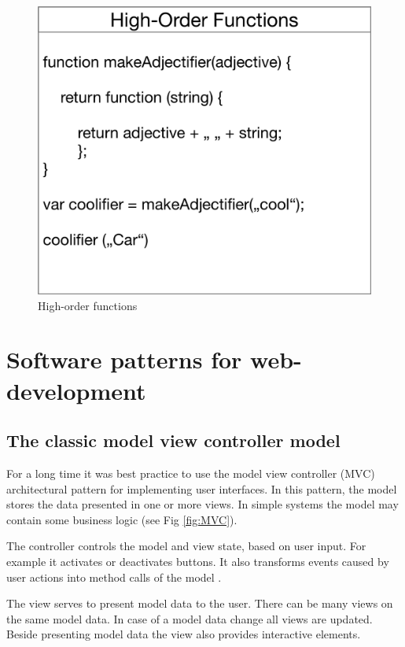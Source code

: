 \begin{figure}[H]
	\centering
	\includegraphics[scale=0.6]{bilder/grundlagen/fp1.png}
	\caption{High-order functions}
	\label{fig:HF}
\end{figure}

\section{Software patterns for web-development}

\subsection{The classic model view controller model}

For a long time it was best practice to use the model view controller (MVC) architectural 
pattern for implementing user interfaces. In this pattern, the model stores the data 
presented in one or more views. In simple systems the model may contain some
 business logic (see Fig \ref{fig:MVC}).

The controller controls the model and view state, based on user input.
For example it activates or deactivates buttons.
 It also transforms events caused by user actions into method calls of the model 
\cite{GOLL}. 
 
The view serves to present model data to the user. There can be many views on the 
same model data. In case of a model data change all views are updated. 
Beside presenting model data the view also provides interactive elements.

